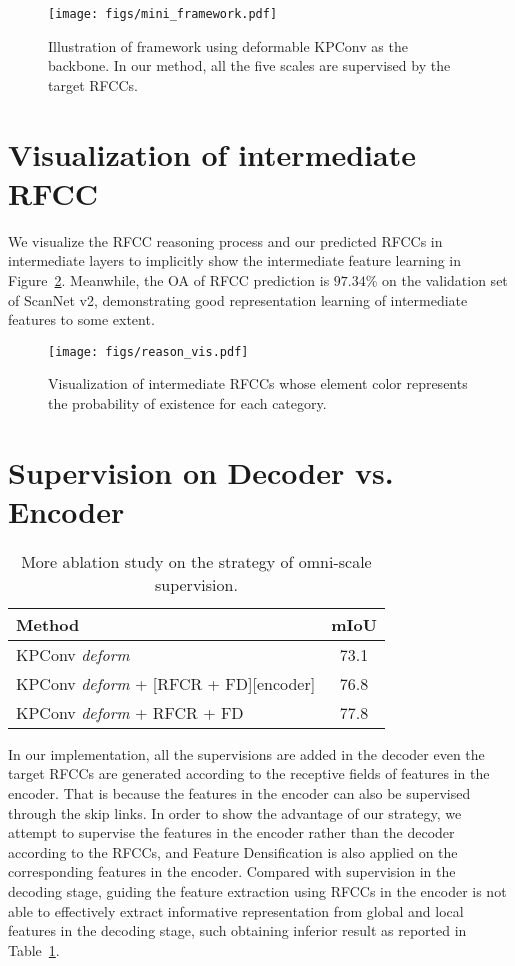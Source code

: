 \documentclass[final]{cvpr}
\begin{document}
\begin{figure}
    \centering
    \texttt{[image: figs/mini\_framework.pdf]}
    \caption{Illustration of framework using deformable KPConv as the backbone. In our method, all the five scales are supervised by the target RFCCs.}
    \label{fig:mini_framework}
\end{figure}

\section{Visualization of intermediate RFCC}
\label{sec:rfcc}
We visualize the RFCC reasoning process and our predicted RFCCs in intermediate layers to implicitly show the intermediate feature learning in Figure~\ref{fig:reason}. Meanwhile, the OA of RFCC prediction is $97.34\%$ on the validation set of ScanNet v2, demonstrating good representation learning of intermediate features to some extent.
\begin{figure}[h!]
    \centering
    \texttt{[image: figs/reason\_vis.pdf]}
    \caption{Visualization of intermediate RFCCs whose element color represents the probability of existence for each category. }
    \label{fig:reason}
\end{figure}

\section{Supervision on Decoder vs. Encoder}
\label{sec:encoder}

\begin{table}[h]
    \centering
    \begin{tabular}{lc}
    \toprule
        Method &  mIoU\\
    \midrule
        KPConv \textit{deform} & 73.1\\
    \midrule
        KPConv \textit{deform} + [RFCR + FD][encoder] & 76.8\\
        KPConv \textit{deform} + RFCR + FD & 77.8\\
    \bottomrule
    \end{tabular}
    \caption{More ablation study on the strategy of omni-scale supervision.}
    \label{tab:encoder}
\end{table}



In our implementation, all the supervisions are added in the decoder even the target RFCCs are generated according to the receptive fields of features in the encoder. That is because the features in the encoder can also be supervised through the skip links. In order to show the advantage of our strategy, we attempt to supervise the features in the encoder rather than the decoder according to the RFCCs, and Feature Densification is also applied on the corresponding features in the encoder. Compared with supervision in the decoding stage, guiding the feature extraction using RFCCs in the encoder is not able to effectively extract informative representation from global and local features in the decoding stage, such obtaining inferior result as reported in Table~\ref{tab:encoder}. 
\end{document}
